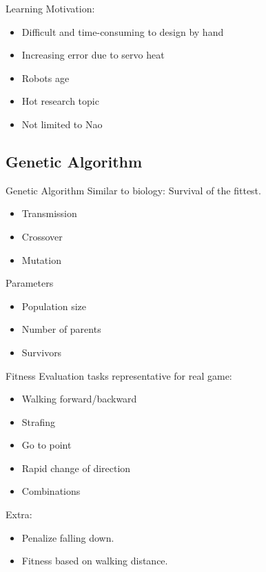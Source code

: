 \documentclass{beamer}
\begin{document}
\begin{frame}{Learning}
	Motivation:
	\begin{itemize}
		\item Difficult and time-consuming to design by hand
		\item Increasing error due to servo heat
		\item Robots age
		\item Hot research topic
		\item Not limited to Nao
	\end{itemize}
\end{frame}

\subsection{Genetic Algorithm}
\begin{frame}{Genetic Algorithm}
	Similar to biology: Survival of the fittest.
    \begin{itemize}
		\item Transmission
		\item Crossover
		\item Mutation
	\end{itemize}


    Parameters
	\begin{itemize}
		\item Population size 
		\item Number of parents
		\item Survivors
	\end{itemize}
\end{frame}

\begin{frame}{Fitness}
    Evaluation tasks representative for real game:
    \begin{itemize}
        \item Walking forward/backward
		\item Strafing
	    \item Go to point
		\item Rapid change of direction
		\item Combinations
    \end{itemize}

    Extra:
    \begin{itemize}
    \item Penalize falling down.    
    \item Fitness based on walking distance.
    \end{itemize}
\end{frame}
\end{document}
